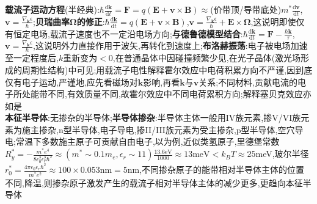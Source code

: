 \documentclass[UTF8,10pt,a4paper]{article}
\begin{document}
\begin{multicols}{2}
\textbf{载流子运动方程}(半经典):$\hbar\frac{\mathrm{d}\bm{k}}{\mathrm{d}t}=\bm{F}=q(\bm{E}+\bm{v}\times\bm{B})\approx$(价带顶/导带底处)$m^*\frac{\mathrm{d}\bm{v}}{\mathrm{d}t}$,$\bm{v}=\frac{\nabla_{\bm{k}}\epsilon}{\hbar}$;\textbf{贝瑞曲率$\bm{\Omega}$的修正}:$\hbar\frac{\mathrm{d}\bm{k}}{\mathrm{d}t}=q(\bm{E}+\bm{v}\times\bm{B})$,$\bm{v}=\frac{\nabla_{\bm{k}}\epsilon}{\hbar}+\bm{E}\times\bm{\Omega}$,这说明即使仅有恒定电场,载流子速度也不一定沿电场方向;\textbf{与德鲁德模型结合}:$\hbar\frac{\mathrm{d}\bm{k}}{\mathrm{d}t}=\bm{F}-\frac{\hbar\bm{k}}{\tau}$,$\bm{v}=\frac{\nabla_{\bm{k}}\epsilon}{\hbar}$,这说明外力直接作用于波矢,再转化到速度上;\textbf{布洛赫振荡}:电子被电场加速至一定程度后,$k$重新变为$<0$,在普通晶体中因碰撞频繁少见,在光子晶体(激光场形成的周期性结构)中可见;用载流子电性解释霍尔效应中电荷积累方向不严谨,因到底仅有电子运动,严谨地,应先看磁场对$\bm{k}$影响,再看$\bm{k}$与$\bm{v}$关系;不同材料,贡献电流的电子所处能带不同,有效质量不同,故霍尔效应中不同电荷累积方向;解释塞贝克效应亦如是\\
\textbf{本征半导体}:无掺杂的半导体;\textbf{半导体掺杂}:半导体主体一般用IV族元素,掺V/VI族元素为施主掺杂,n型半导体,电子导电,掺II/III族元素为受主掺杂,p型半导体,空穴导电;常温下多数施主原子可贡献自由电子,以为例,近似类氢原子,里德堡常数$R_y^*=-\frac{m^*e^4}{8\epsilon_0^2\epsilon_r^2\hbar^2}\approx(m^*\sim 0.1m_e,\epsilon_r\sim 11)\frac{13.6\text{eV}}{1000}\approx 13\text{meV}<k_BT\approx 25$meV,玻尔半径$r_0^*=\frac{4\pi\epsilon_0\epsilon_r\hbar^2}{m^*e^2}\approx 100\times 0.053\text{nm}=5$nm,不同掺杂原子的能带相对半导体主体的位置不同,降温,则掺杂原子激发产生的载流子相对半导体主体的减少更多,更趋向本征半导体\\

\end{multicols}
\end{document}
